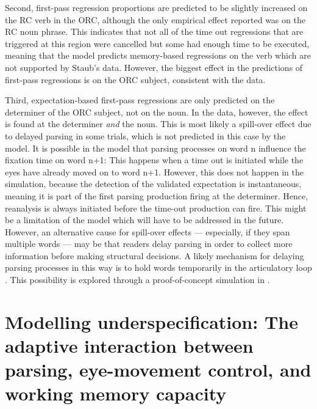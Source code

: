 \documentclass{cambridge7A}\usepackage[]{graphicx}\usepackage[]{color}
\begin{document}
Second,  first-pass regression proportions are predicted to be slightly increased on the RC verb in the ORC, although the only empirical effect reported was on the RC noun phrase. This indicates that not all of the time out regressions that are triggered at this region were cancelled but some had enough time to be executed, meaning that the model predicts memory-based regressions on the verb which are not supported by Staub's data. However, the biggest effect in the predictions of first-pass regressions is on the ORC subject, consistent with the data.

Third, expectation-based first-pass regressions are only predicted on the determiner of the ORC subject, not on the noun. In the data, however, the effect is found at the determiner \emph{and} the noun. This is most likely a spill-over effect due to delayed parsing in some trials, which is not predicted in this case by the model. It is possible in the model that parsing processes on word n influence the fixation time on word n+1: This happens when a time out is initiated while the eyes have already moved on to word n+1. However, this does not happen in the simulation, because the detection of the validated expectation is instantaneous, meaning it is part of the first parsing production firing at the determiner. Hence, reanalysis is always initiated before the time-out production can fire. This might be a limitation of the model which will have to be addressed in the future. However, an alternative cause for spill-over effects --- especially, if they span multiple words --- may be that readers delay parsing in order to collect more information before making structural decisions.
A likely mechanism for delaying parsing processes in this way is to hold words temporarily in the articulatory loop \citep{BaddeleyHitch1974,Baddeley2003}. This possibility is explored through a proof-of-concept simulation in \cite{engelmann:phd}.

\section[Modelling underspecification]{Modelling underspecification: The adaptive interaction between parsing, eye-movement control, and working memory capacity}
\label{sec:sim:III}
\end{document}
